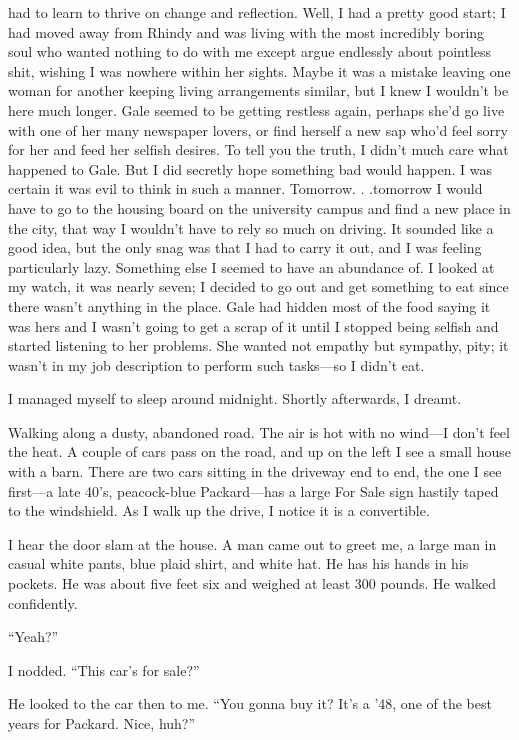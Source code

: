 had to learn to thrive on change and reflection. Well, I had a pretty
good start; I had moved away from Rhindy and was living with the most
incredibly boring soul who wanted nothing to do with me except argue
endlessly about pointless shit, wishing I was nowhere within her sights.
Maybe it was a mistake leaving one woman for another keeping living
arrangements similar, but I knew I wouldn't be here much longer. Gale
seemed to be getting restless again, perhaps she'd go live with one of
her many newspaper lovers, or find herself a new sap who'd feel sorry
for her and feed her selfish desires. To tell you the truth, I didn't
much care what happened to Gale. But I did secretly hope something bad
would happen. I was certain it was evil to think in such a manner.
Tomorrow. . .tomorrow I would have to go to the housing board on the
university campus and find a new place in the city, that way I wouldn't
have to rely so much on driving. It sounded like a good idea, but the
only snag was that I had to carry it out, and I was feeling particularly
lazy. Something else I seemed to have an abundance of. I looked at my
watch, it was nearly seven; I decided to go out and get something to eat
since there wasn't anything in the place. Gale had hidden most of the
food saying it was hers and I wasn't going to get a scrap of it until I
stopped being selfish and started listening to her problems. She wanted
not empathy but sympathy, pity; it wasn't in my job description to
perform such tasks---so I didn't eat.

I managed myself to sleep around midnight. Shortly afterwards, I dreamt.

Walking along a dusty, abandoned road. The air is hot with no wind---I
don't feel the heat. A couple of cars pass on the road, and up on the
left I see a small house with a barn. There are two cars sitting in the
driveway end to end, the one I see first---a late 40's, peacock-blue
Packard---has a large For Sale sign hastily taped to the windshield. As
I walk up the drive, I notice it is a convertible.

I hear the door slam at the house. A man came out to greet me, a large
man in casual white pants, blue plaid shirt, and white hat. He has his
hands in his pockets. He was about five feet six and weighed at least
300 pounds. He walked confidently.

``Yeah?''

I nodded. ``This car's for sale?''

He looked to the car then to me. ``You gonna buy it? It's a '48, one of
the best years for Packard. Nice, huh?''

